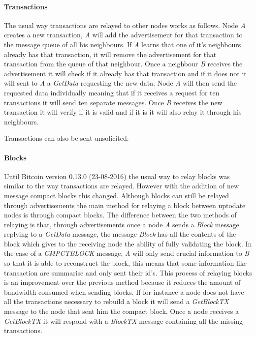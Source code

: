 \paragraph*{Transactions} 
The usual way transactions are relayed to other nodes works as follows. Node \textit{A} creates a new transaction, \textit{A} will add the advertisement for that transaction to the message queue of all his neighbours. If \textit{A} learns that one of it's neighbours already has that transaction, it will remove the advertisement for that transaction from the queue of that neighbour. Once a neighbour \textit{B} receives the advertisement it will check if it already has that transaction and if it does not it will sent to \textit{A} a \textit{GetData} requesting the new data. Node \textit{A} will then send the requested data individually meaning that if it receives a request for ten transactions it will send ten separate messages. Once \textit{B} receives the new transaction it will verify if it is valid and if it is it will also relay it through his neighbours.

Transactions can also be sent unsolicited.

\paragraph*{Blocks}
Until Bitcoin version 0.13.0 (23-08-2016) the usual way to relay blocks was similar to the way transactions are relayed. However with the addition of new message compact blocks this changed. Although blocks can still be relayed through advertisements the main method for relaying a block between uptodate nodes is through compact blocks. The difference between the two methods of relaying is that, through advertisements once a node \textit{A} sends a \textit{Block} message replying to a \textit{GetData} message, the message \textit{Block} has all the contents of the block which gives to the receiving node the ability of fully validating the block. In the case of a \textit{CMPCTBLOCK} message, \textit{A} will only send crucial information to \textit{B} so that it is able to reconstruct the block, this means that some information like transaction are summarise and only sent their id's. This process of relaying blocks is an improvement over the previous method because it reduces the amount of bandwidth consumed when sending blocks. If for instance a node does not have all the transactions necessary to rebuild a block it will send a \textit{GetBlockTX} message to the node that sent him the compact block. Once a node receives a \textit{GetBlockTX} it will respond with a  \textit{BlockTX} message containing all the missing transactions.

